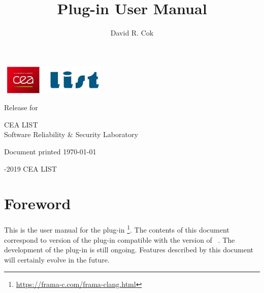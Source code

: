 \documentclass[web]{frama-c-book}
\begin{document}

\begin{titlepage}
\begin{flushleft}
\includegraphics[height=14mm]{cealistlogo.jpg}
\end{flushleft}
\vfill
\title{\fclang Plug-in User Manual}{Release \version for \fclang \fclangversion
}
\author{David R. Cok}
\begin{center}
CEA LIST\\ Software Reliability \& Security Laboratory
\end{center}
\begin{center}
	Document printed \ddMyyyydate\today
\end{center}
\vfill
\begin{flushleft}
  -2019 CEA LIST
\end{flushleft}
\end{titlepage}

\tableofcontents


\chapter*{Foreword}
\markright{}

This is the user manual for the \framac plug-in
\fclang\footnote{\url{https://frama-c.com/frama-clang.html}}. The contents of this
document correspond to version \fclangversion of the plug-in compatible with the
\fcversion version of \framac~\cite{userman,fac15}.  The development of
the \fclang plug-in is still ongoing.  Features described by this document will certainly
evolve in the future.
\end{document}
